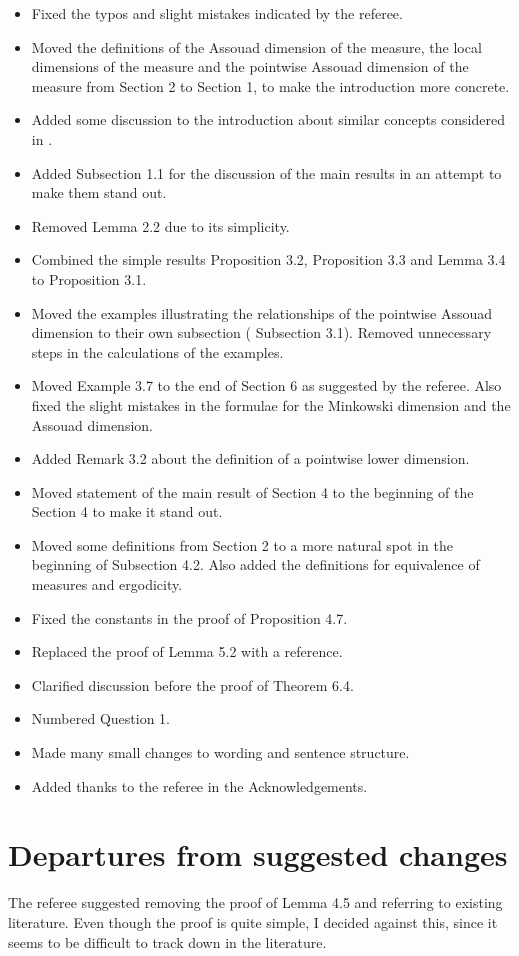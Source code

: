 \documentclass[12pt]{amsart}
\numberwithin{equation}{section}
\newcommand{\old}[1]{{\color{red} #1}}
\newcommand{\new}[1]{{\color{blue} #1}}
\theoremstyle{plain}
\theoremstyle{definition}
\theoremstyle{remark}
\begin{document}
\begin{itemize}
    \item Fixed the typos and slight mistakes indicated by the referee.
    \item Moved the definitions of the Assouad dimension of the measure, the local dimensions of the measure and the pointwise Assouad dimension of the measure from \old{Section 2} to \new{Section 1}, to make the introduction more concrete.
    \item Added some discussion to the introduction about similar concepts considered in \cite{BBL}.
    \item Added \new{Subsection 1.1} for the discussion of the main results in an attempt to make them stand out.
    \item Removed \old{Lemma 2.2} due to its simplicity.
    \item Combined the simple results \old{Proposition 3.2}, \old{Proposition 3.3} and \old{Lemma 3.4} to \new{Proposition 3.1}.
    \item Moved the examples illustrating the relationships of the pointwise Assouad dimension to their own subsection (\new{Subsection 3.1}). Removed unnecessary steps in the calculations of the examples.
    \item Moved \old{Example 3.7} to the end of \new{Section 6} as suggested by the referee. Also fixed the slight mistakes in the formulae for the Minkowski dimension and the Assouad dimension.
    \item Added \new{Remark 3.2} about the definition of a pointwise lower dimension.
    \item Moved statement of the main result of \old{Section 4} to the beginning of the \new{Section 4} to make it stand out.
    \item Moved some definitions from \old{Section 2} to a more natural spot in the beginning of \new{Subsection 4.2}. Also added the definitions for equivalence of measures and ergodicity.
    \item Fixed the constants in the proof of \old{Proposition 4.7}.
    \item Replaced the proof of \old{Lemma 5.2} with a reference.
    \item Clarified discussion before the proof of \new{Theorem 6.4}.
    \item Numbered \new{Question 1}.
    \item Made many small changes to wording and sentence structure.
    \item Added thanks to the referee in the Acknowledgements.
\end{itemize}
\section*{Departures from suggested changes}
The referee suggested removing the proof of Lemma 4.5 and referring to existing literature. Even though the proof is quite simple, I decided against this, since it seems to be difficult to track down in the literature.



\end{document}
